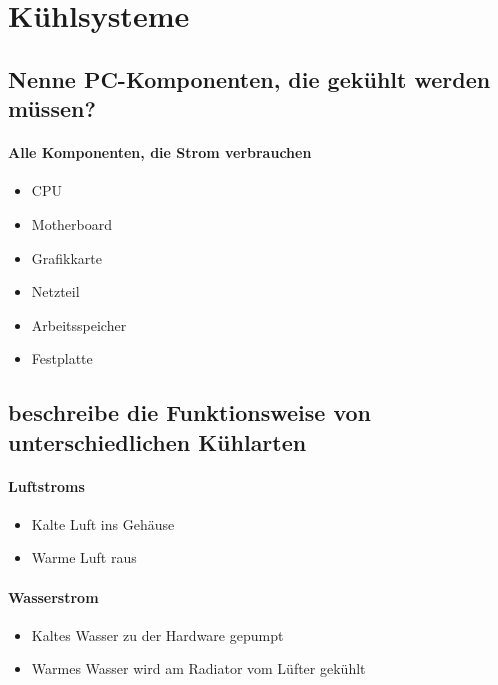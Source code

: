 \documentclass[a4paper]{article}
\begin{document}
    \section{Kühlsysteme}\label{sec:kuehlsysteme}

    \subsection{\color{red}Nenne PC-Komponenten, die gekühlt werden müssen?}\label{subsec:nenne-pc-komponenten-die-gekühlt-werden-müssen?}

    \paragraph{\color{codegreen}Alle Komponenten, die Strom verbrauchen}
    \begin{itemize}
        \color{magenta}
        \item CPU
        \item Motherboard
        \item Grafikkarte
        \item Netzteil
        \item Arbeitsspeicher
        \item Festplatte
    \end{itemize}

    \subsection{\color{red}beschreibe die Funktionsweise von unterschiedlichen Kühlarten}\label{subsec:beschreibe-die-funktionsweise-von-unterschiedlichen-kühlarten}

    \paragraph{\color{codegreen}Luftstroms}
    \begin{itemize}
        \color{magenta}
        \item Kalte Luft ins Gehäuse
        \item Warme Luft raus
    \end{itemize}

    \paragraph{\color{codegreen}Wasserstrom}
    \begin{itemize}
        \color{magenta}
        \item  Kaltes Wasser zu der Hardware gepumpt
        \item Warmes Wasser wird am Radiator vom Lüfter gekühlt
    \end{itemize}
\end{document}
